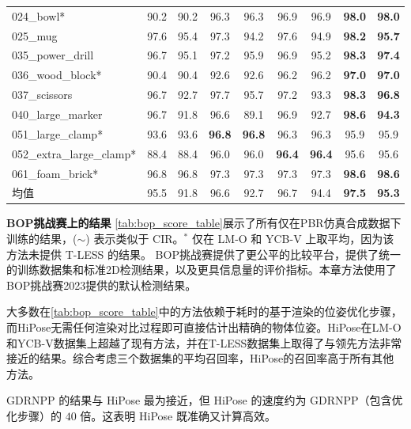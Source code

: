 \begin{table}[ht]
{\begin{tabular}{@{}l|c|c|c|c|c|c|c|c@{}}
       024\_bowl*             & 90.2 &  90.2& 96.3& 96.3& 96.9& 96.9           &\textbf{98.0}	&\textbf{98.0}\\
       025\_mug               & 97.6&  95.4& 97.3& 94.2& 97.6& 94.9         & \textbf{98.2}	&\textbf{95.7}\\
       035\_power\_drill      & 96.7&  95.1& 97.2& 95.9& 96.9& 95.2           & \textbf{98.3}&	\textbf{97.4}\\
       036\_wood\_block*      & 90.4&  90.4& 92.6& 92.6& 96.2& 96.2           & \textbf{97.0}	&\textbf{97.0}\\
       037\_scissors          & 96.7&  92.7& 97.7& 95.7& 97.2& 93.3            &\textbf{98.3}&	\textbf{96.8}\\
       040\_large\_marker     & 96.7&  91.8& 96.6& 89.1& 96.9 &92.7          & \textbf{98.6}	&\textbf{94.3}\\
       051\_large\_clamp*     & 93.6&  93.6&  \textbf{96.8}& \textbf{96.8}& 96.3 &96.3          & 95.9&	95.9\\
       052\_extra\_large\_clamp* & 88.4&  88.4& 96.0& 96.0 &\textbf{96.4}& \textbf{96.4}         & 95.6&	95.6\\
       061\_foam\_brick*          & 96.8&  96.8& 97.3& 97.3& 97.3 &97.3       & \textbf{98.6}	&\textbf{98.6}\\
       \hline
       均值 & 95.5&  91.8&  96.6 &92.7& 96.7 &94.4             &\textbf{97.5} &\textbf{95.3} \\
      \bottomrule
    \end{tabular}
    }
\end{table}

\textbf{BOP挑战赛上的结果 } \autoref{tab:bop_score_table}展示了所有仅在PBR仿真合成数据下训练的结果，($\sim$) 表示类似于 CIR\cite{lipson2022coupled}。$^*$ 仅在 LM-O 和 YCB-V 上取平均，因为该方法未提供 T-LESS 的结果。 BOP挑战赛提供了更公平的比较平台，提供了统一的训练数据集和标准2D检测结果，以及更具信息量的评价指标\cite{hodan2018bop}。本章方法使用了BOP挑战赛2023提供的默认检测结果。

大多数在\autoref{tab:bop_score_table}中的方法依赖于耗时的基于渲染的位姿优化步骤，而HiPose无需任何渲染对比过程即可直接估计出精确的物体位姿。HiPose在LM-O和YCB-V数据集上超越了现有方法，并在T-LESS数据集上取得了与领先方法非常接近的结果。综合考虑三个数据集的平均召回率，HiPose的召回率高于所有其他方法。

GDRNPP\cite{liu2022gdrnpp_bop} 的结果与 HiPose 最为接近，但 HiPose 的速度约为 GDRNPP（包含优化步骤）的 $40$ 倍。这表明 HiPose 既准确又计算高效。

